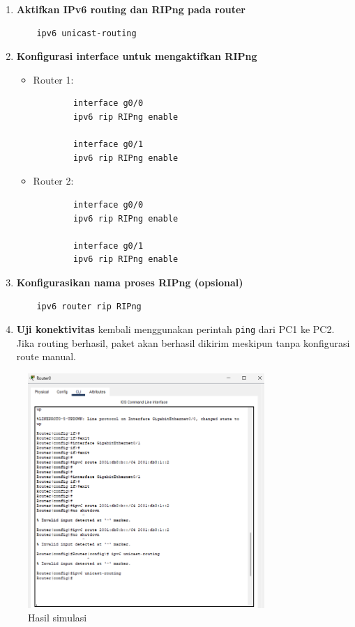 \begin{enumerate}
    \item \textbf{Aktifkan IPv6 routing dan RIPng pada router}
    \begin{verbatim}
    ipv6 unicast-routing
    \end{verbatim}

    \item \textbf{Konfigurasi interface untuk mengaktifkan RIPng}
    \begin{itemize}
        \item Router 1:
        \begin{verbatim}
        interface g0/0
        ipv6 rip RIPng enable

        interface g0/1
        ipv6 rip RIPng enable
        \end{verbatim}

        \item Router 2:
        \begin{verbatim}
        interface g0/0
        ipv6 rip RIPng enable

        interface g0/1
        ipv6 rip RIPng enable
        \end{verbatim}
    \end{itemize}

    \item \textbf{Konfigurasikan nama proses RIPng (opsional)}
    \begin{verbatim}
    ipv6 router rip RIPng
    \end{verbatim}

    \item \textbf{Uji konektivitas} kembali menggunakan perintah \texttt{ping} dari PC1 ke PC2. Jika routing berhasil, paket akan berhasil dikirim meskipun tanpa konfigurasi route manual.
\end{enumerate}
\begin{figure}
    \centering
    \includegraphics[width=0.8\textwidth]{P1/img/tumodsimulasi.png}
    \caption{Hasil simulasi}
    \label{fig:hasil_routing_ipv6}
    


\end{figure}

